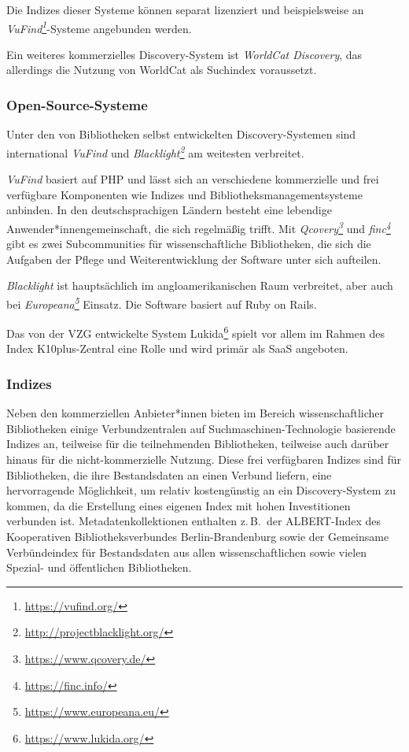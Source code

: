 \documentclass[
  11pt,
  letterpaper,
  DIV=11,
  twoside]{scrreprt}
\DeclareRobustCommand{\href}[2]{#2\footnote{\url{#1}}}
\begin{document}
Die Indizes dieser Systeme können separat lizenziert und beispielsweise
an \emph{\href{https://vufind.org/}{VuFind}}-Systeme angebunden werden.

Ein weiteres kommerzielles Discovery-System ist \emph{WorldCat
Discovery}, das allerdings die Nutzung von WorldCat als Suchindex
voraussetzt.

\subsubsection{Open-Source-Systeme}\label{open-source-systeme}

Unter den von Bibliotheken selbst entwickelten Discovery-Systemen sind
international \emph{VuFind} und
\emph{\href{http://projectblacklight.org/}{Blacklight}} am weitesten
verbreitet.

\emph{VuFind} basiert auf PHP und lässt sich an verschiedene
kommerzielle und frei verfügbare Komponenten wie Indizes und
Bibliotheksmanagementsysteme anbinden. In den deutschsprachigen Ländern
besteht eine lebendige Anwender*innengemeinschaft, die sich regelmäßig
trifft. Mit \emph{\href{https://www.qcovery.de/}{Qcovery}} und
\emph{\href{https://finc.info/}{finc}} gibt es zwei Subcommunities für
wissenschaftliche Bibliotheken, die sich die Aufgaben der Pflege und
Weiterentwicklung der Software unter sich aufteilen.

\emph{Blacklight} ist hauptsächlich im angloamerikanischen Raum
verbreitet, aber auch bei
\emph{\href{https://www.europeana.eu/}{Europeana}} Einsatz. Die Software
basiert auf Ruby on Rails.

Das von der VZG entwickelte System
\href{https://www.lukida.org/}{Lukida} spielt vor allem im Rahmen des
Index K10plus-Zentral eine Rolle und wird primär als {SaaS} angeboten.

\subsubsection{Indizes}\label{indizes}

Neben den kommerziellen Anbieter*innen bieten im Bereich
wissenschaftlicher Bibliotheken einige Verbundzentralen auf
Suchmaschinen-Technologie basierende Indizes an, teilweise für die
teilnehmenden Bibliotheken, teilweise auch darüber hinaus für die
nicht-kommerzielle Nutzung. Diese frei verfügbaren Indizes sind für
Bibliotheken, die ihre Bestandsdaten an einen Verbund liefern, eine
hervorragende Möglichkeit, um relativ kostengünstig an ein
Discovery-System zu kommen, da die Erstellung eines eigenen Index mit
hohen Investitionen verbunden ist. Metadatenkollektionen enthalten
z.\,B.~der ALBERT-Index des Kooperativen Bibliotheksverbundes
Berlin-Brandenburg sowie der Gemeinsame Verbündeindex für Bestandsdaten
aus allen wissenschaftlichen sowie vielen Spezial- und öffentlichen
Bibliotheken.
\end{document}
